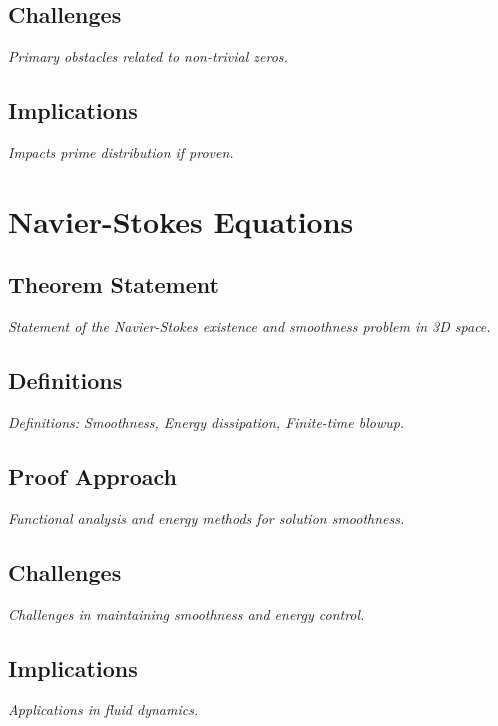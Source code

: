\documentclass[12pt, a4paper]{article}
\begin{document}
\subsection{Challenges}
\textit{Primary obstacles related to non-trivial zeros.}

\subsection{Implications}
\textit{Impacts prime distribution if proven.}


\section{Navier-Stokes Equations}
\subsection{Theorem Statement}
\begin{theorem}
\label{thm:navier_stokes}
\textit{Statement of the Navier-Stokes existence and smoothness problem in 3D space.}
\end{theorem}

\subsection{Definitions}
\textit{Definitions: Smoothness, Energy dissipation, Finite-time blowup.}

\subsection{Proof Approach}
\textit{Functional analysis and energy methods for solution smoothness.}

\subsection{Challenges}
\textit{Challenges in maintaining smoothness and energy control.}

\subsection{Implications}
\textit{Applications in fluid dynamics.}
\end{document}
